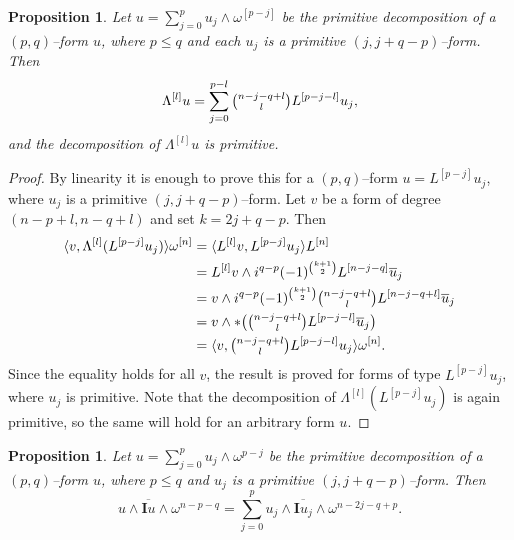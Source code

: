 \documentclass[11pt,a4paper]{amsart}
\def\^#1{^{[#1]}}
\def\I{\mathbf{I}}
\def\la{\langle}
\def\ra{\rangle}
\newtheorem{prop}[theo]{Proposition}
\theoremstyle{definition}
\theoremstyle{remark}
\numberwithin{equation}{section}
\begin{document}
\begin{prop}
    Let $u = \sum_{j=0}^p u_j \wedge \omega\^{p-j}$ be the primitive
decomposition of a $(p,q)$--form $u$, where $p \leq q$ and each $u_j$ is a
primitive $(j,j+q-p)$--form. Then
\begin{equation*}
  \Lambda\^l u 
  = \sum_{j=0}^{p-l} \tbinom{n-j-q+l}{l} L\^{p-j-l} u_j, 
\end{equation*}
and the decomposition of $\Lambda\^l u$ is primitive.
\end{prop}

\begin{proof}
  By linearity it is enough to prove this for a $(p,q)$--form
$u = L\^{p-j} u_j$, where $u_j$ is a primitive $(j,j+q-p)$--form. Let
$v$ be a form of degree $(n-p+l,n-q+l)$ and set $k = 2j+q-p$. Then
  \begin{align*}
    \la v, \Lambda\^l (L\^{p-j} u_j ) \ra \omega\^ n
    &= \la L\^l v, L\^{p-j} u_j \ra L\^ n \\
    &= L\^l v \wedge i^{q-p}(-1)^{\binom{k+1}{2}} L\^{n-j-q} \overline u_j  \\
    &= v \wedge i^{q-p}(-1)^{\binom{k+1}{2}}
    \tbinom{n-j-q+l}{l} L\^{n-j-q+l} \overline u_j  \\
    &= v \wedge * \bigl( \tbinom{n-j-q+l}{l} L\^{p-j-l} \overline u_j \bigr) \\
    &= \la v, \tbinom{n-j-q+l}{l} L\^{p-j-l} u_j \ra \omega\^ n.
  \end{align*}
Since the equality holds for all $v$, the result is proved for forms
of type $L\^{p-j} u_j$, where $u_j$ is primitive. Note that the
decomposition of $\Lambda\^l (L\^{p-j} u_j)$ is again primitive, so
the same will hold for an arbitrary form $u$.
\end{proof}


\begin{prop}
  \label{16}
  Let $u = \sum_{j=0}^p u_j \wedge \omega^{p-j}$ be the primitive
decomposition of a $(p,q)$--form $u$, where $p \leq q$ and $u_j$ is a
primitive $(j,j+q-p)$--form. Then
$$
u \wedge \overline{\I u} \wedge \omega^{n-p-q}
= \sum_{j=0}^p u_j \wedge \overline{\I u_j} \wedge \omega^{n-2j-q+p}.
$$
\end{prop}
\end{document}
